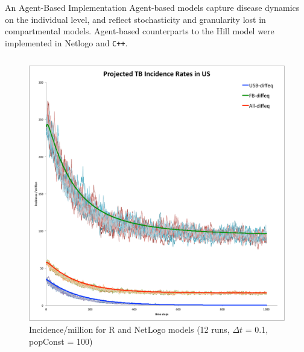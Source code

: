\documentclass[final]{beamer}
\begin{document}
\begin{frame}
\begin{columns}
\begin{column}{.3\textwidth}
      \vspace{-.5em}
      \begin{block}{An Agent-Based Implementation}
        Agent-based models capture disease dynamics on the individual level, and
        reflect stochasticity and granularity lost in compartmental models.
        Agent-based counterparts to the Hill model were implemented in Netlogo
        and \texttt{C++}.
        \begin{block}{}
          \vspace{-2em}
          \begin{column}{.45\textwidth}
            \begin{figure}[h]
              \begin{center}
                \includegraphics[width=\textwidth]{NLHMinc}
              \end{center}
              \caption{Incidence/million for R and NetLogo models (12 runs, $\Delta t$ = 0.1, popConst = 100)}
              \label{fig:NLHMinc}
            \end{figure}
          \end{column}
          \begin{column}{.45\textwidth}
            \begin{figure}[h]
              \begin{center}

\end{center}
\end{figure}
\end{column}
\end{block}
\end{block}
\end{column}
\end{columns}
\end{frame}
\end{document}
